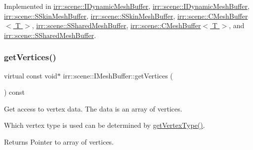 Implemented in \hyperlink{classirr_1_1scene_1_1IDynamicMeshBuffer_a433e0e8ec301ce898dc373ca65e30e85}{irr\+::scene\+::\+I\+Dynamic\+Mesh\+Buffer}, \hyperlink{classirr_1_1scene_1_1IDynamicMeshBuffer_a433e0e8ec301ce898dc373ca65e30e85}{irr\+::scene\+::\+I\+Dynamic\+Mesh\+Buffer}, \hyperlink{structirr_1_1scene_1_1SSkinMeshBuffer_a61271053674a773fd4afcdffafddf9b3}{irr\+::scene\+::\+S\+Skin\+Mesh\+Buffer}, \hyperlink{structirr_1_1scene_1_1SSkinMeshBuffer_a61271053674a773fd4afcdffafddf9b3}{irr\+::scene\+::\+S\+Skin\+Mesh\+Buffer}, \hyperlink{classirr_1_1scene_1_1CMeshBuffer_ad9463b97ee94bbc26bbb11bf867ea830}{irr\+::scene\+::\+C\+Mesh\+Buffer$<$ T $>$}, \hyperlink{structirr_1_1scene_1_1SSharedMeshBuffer_a564b81fd7498e6df3c912e1a7dec21de}{irr\+::scene\+::\+S\+Shared\+Mesh\+Buffer}, \hyperlink{classirr_1_1scene_1_1CMeshBuffer_ad9463b97ee94bbc26bbb11bf867ea830}{irr\+::scene\+::\+C\+Mesh\+Buffer$<$ T $>$}, and \hyperlink{structirr_1_1scene_1_1SSharedMeshBuffer_a564b81fd7498e6df3c912e1a7dec21de}{irr\+::scene\+::\+S\+Shared\+Mesh\+Buffer}.

\mbox{\label{classirr_1_1scene_1_1IMeshBuffer_a99891e516246b2cff13b362a435c8028}} 
\subsubsection{\texorpdfstring{get\+Vertices()}{getVertices()}\hspace{0.1cm}{\footnotesize\ttfamily [2/4]}}
{\footnotesize\ttfamily virtual const void$\ast$ irr\+::scene\+::\+I\+Mesh\+Buffer\+::get\+Vertices (\begin{DoxyParamCaption}{ }\end{DoxyParamCaption}) const\hspace{0.3cm}{\ttfamily [pure virtual]}}



Get access to vertex data. The data is an array of vertices. 

Which vertex type is used can be determined by \hyperlink{classirr_1_1scene_1_1IMeshBuffer_a4d7a84ae4416487736f0ed0f519bb4f0}{get\+Vertex\+Type()}. \begin{DoxyReturn}{Returns}
Pointer to array of vertices. 
\end{DoxyReturn}



